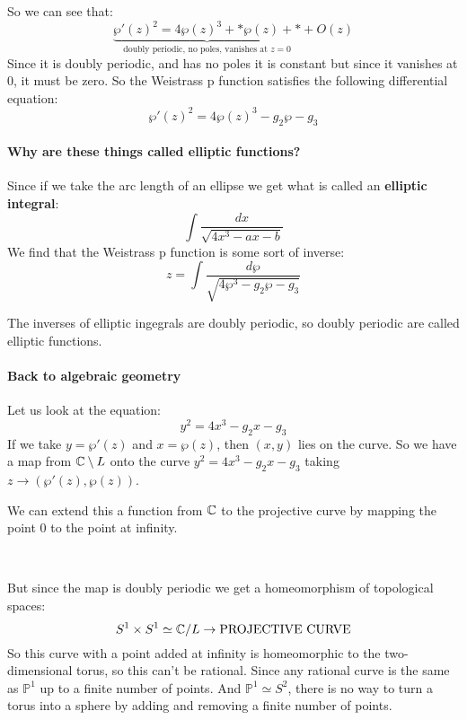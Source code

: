 So we can see that:\begin{equation*}
    \underbrace{{\wp'(z)}^2 = {4\wp(z)}^3 + \ast \wp(z)+\ast}_{\text{doubly periodic, no poles, vanishes at }z=0} + O(z)
\end{equation*}
Since it is doubly periodic, and has no poles it is constant but since it vanishes at $0$, it must be zero. So the Weistrass p function satisfies the following differential equation:\begin{equation*}
    \wp'(z)^2 = {4\wp(z)}^3-g_2\wp-g_3
\end{equation*} 

\paragraph*{Why are these things called elliptic functions?}

Since if we take the arc length of an ellipse we get what is called an \textbf{elliptic integral}:\begin{equation*}
    \int \frac{dx}{\sqrt{4x^3-ax-b}}
\end{equation*}
We find that the Weistrass p function is some sort of inverse:\begin{equation*}
    z = \int \frac{d\wp}{\sqrt{4\wp^3-g_2\wp-g_3}}
\end{equation*}

The inverses of elliptic ingegrals are doubly periodic, so doubly periodic are called elliptic functions.

\paragraph*{Back to algebraic geometry}
Let us look at the equation:\[y^2 = 4x^3-g_2x-g_3\]
If we take $y = \wp'(z)$ and $x = \wp(z)$, then $(x,y)$ lies on the curve. So we have a map from $\mathbb{C}\setminus L$ onto the curve $y^2 = 4x^3-g_2x-g_3$ taking $z\rightarrow (\wp'(z),\wp(z))$.

We can extend this a function from $\mathbb{C}$ to the projective curve by mapping the point $0$ to the point at infinity.

\

But since the map is doubly periodic we get a homeomorphism of topological spaces:\begin{equation*}
    S^1\times S^1\simeq \mathbb{C}/L\rightarrow \text{PROJECTIVE CURVE}
\end{equation*}
So this curve with a point added at infinity is homeomorphic to the two-dimensional torus, so this can't be rational. Since any rational curve is the same as $\mathbb{P}^1$ up to a finite number of points. And $\mathbb{P}^1\simeq S^2$, there is no way to turn a torus into a sphere by adding and removing a finite number of points.

